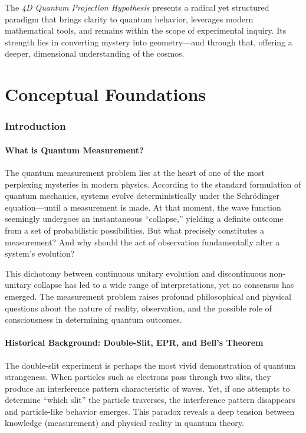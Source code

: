 \documentclass[12pt]{article}
\begin{document}
\par
The \textit{4D Quantum Projection Hypothesis} presents a radical yet structured paradigm that brings clarity to quantum behavior, leverages modern mathematical tools, and remains within the scope of experimental inquiry. Its strength lies in converting mystery into geometry—and through that, offering a deeper, dimensional understanding of the cosmos.

\thispagestyle{plain}

\newpage

\part{Conceptual Foundations}
\section{\texorpdfstring{\textbf{Introduction}}{Introduction}}

\subsection{What is Quantum Measurement?}

The quantum measurement problem lies at the heart of one of the most perplexing mysteries in modern physics. According to the standard formulation of quantum mechanics, systems evolve deterministically under the Schrödinger equation—until a measurement is made. At that moment, the wave function seemingly undergoes an instantaneous “collapse,” yielding a definite outcome from a set of probabilistic possibilities. But what precisely constitutes a measurement? And why should the act of observation fundamentally alter a system’s evolution?

This dichotomy between continuous unitary evolution and discontinuous non-unitary collapse has led to a wide range of interpretations, yet no consensus has emerged. The measurement problem raises profound philosophical and physical questions about the nature of reality, observation, and the possible role of consciousness in determining quantum outcomes.

\subsection{Historical Background: Double-Slit, EPR, and Bell's Theorem}

The double-slit experiment is perhaps the most vivid demonstration of quantum strangeness. When particles such as electrons pass through two slits, they produce an interference pattern characteristic of waves. Yet, if one attempts to determine “which slit” the particle traverses, the interference pattern disappears and particle-like behavior emerges. This paradox reveals a deep tension between knowledge (measurement) and physical reality in quantum theory.
\end{document}
